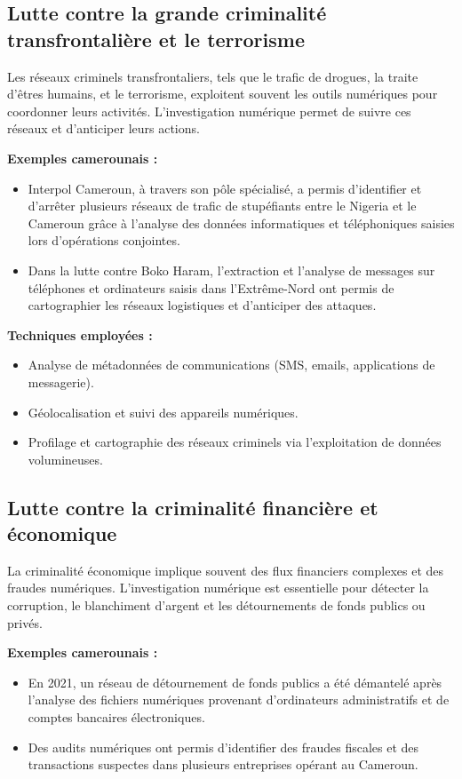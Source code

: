 \documentclass[12pt,a4paper]{article}
\begin{document}
\subsection{Lutte contre la grande criminalité transfrontalière et le terrorisme}

Les réseaux criminels transfrontaliers, tels que le trafic de drogues, la traite d'êtres humains, et le terrorisme, exploitent souvent les outils numériques pour coordonner leurs activités. L'investigation numérique permet de suivre ces réseaux et d'anticiper leurs actions.

\textbf{Exemples camerounais :}
\begin{itemize}[leftmargin=*]
    \item Interpol Cameroun, à travers son pôle spécialisé, a permis d'identifier et d'arrêter plusieurs réseaux de trafic de stupéfiants entre le Nigeria et le Cameroun grâce à l'analyse des données informatiques et téléphoniques saisies lors d'opérations conjointes.
    \item Dans la lutte contre Boko Haram, l'extraction et l'analyse de messages sur téléphones et ordinateurs saisis dans l'Extrême-Nord ont permis de cartographier les réseaux logistiques et d'anticiper des attaques.
\end{itemize}

\textbf{Techniques employées :}
\begin{itemize}[leftmargin=*]
    \item Analyse de métadonnées de communications (SMS, emails, applications de messagerie).
    \item Géolocalisation et suivi des appareils numériques.
    \item Profilage et cartographie des réseaux criminels via l'exploitation de données volumineuses.
\end{itemize}

\subsection{Lutte contre la criminalité financière et économique}

La criminalité économique implique souvent des flux financiers complexes et des fraudes numériques. L'investigation numérique est essentielle pour détecter la corruption, le blanchiment d'argent et les détournements de fonds publics ou privés.

\textbf{Exemples camerounais :}
\begin{itemize}[leftmargin=*]
    \item En 2021, un réseau de détournement de fonds publics a été démantelé après l'analyse des fichiers numériques provenant d'ordinateurs administratifs et de comptes bancaires électroniques.
    \item Des audits numériques ont permis d'identifier des fraudes fiscales et des transactions suspectes dans plusieurs entreprises opérant au Cameroun.
\end{itemize}
\end{document}

